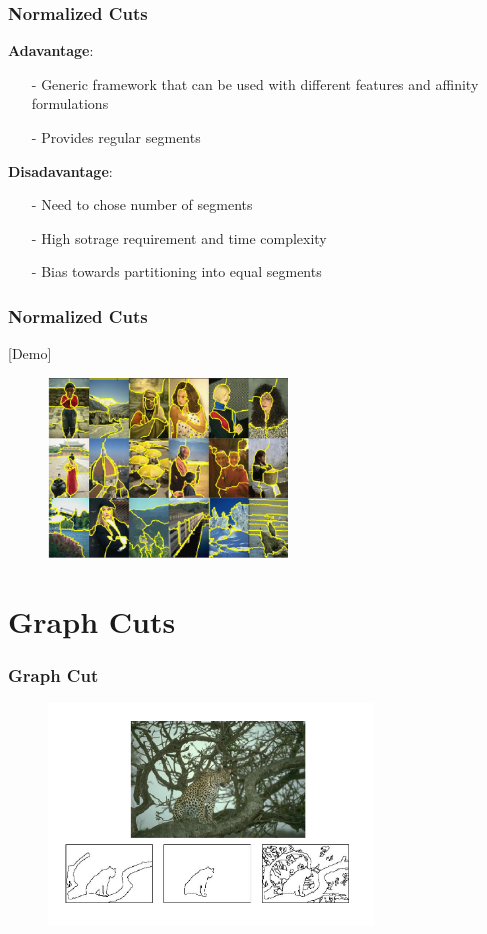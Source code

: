 \documentclass[notheorems,mathserif,table,compress]{beamer}  %
\begin{document}
\begin{frame}
\frametitle{Normalized Cuts}
\textbf{\Large Adavantage}:
\begin{itemize}
\item[-] Generic framework that can be used with different features and affinity formulations
\item[-] Provides regular segments \\
\end{itemize}
\textbf{\Large Disadavantage}:
\begin{itemize}
\item[-] Need to chose number of segments
\item[-] High sotrage requirement and time complexity
\item[-] Bias towards partitioning into equal segments
\end{itemize}
\end{frame}


\begin{frame}
\frametitle{Normalized Cuts}
    \hspace{0.5in} {\color{blue} [Demo]}
    \begin{figure}[!ht]
     \centering
     \includegraphics[width=2.5in]{normale.png} 
     \end{figure}
\end{frame}

\section{Graph Cuts}
\begin{frame}
\frametitle{Graph Cut}
  \begin{figure}[!ht]
  \centering
   \includegraphics[width=3.4in]{pic.png}
   \end{figure}
\end{frame}
\end{document}
